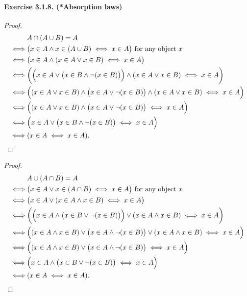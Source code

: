 \paragraph{Exercise 3.1.8. (*Absorption laws)}
\begin{proof}
    \begin{align*}
        & A \cap (A \cup B) = A
        \\\iff& \big( x \in A \land x \in (A \cup B) \iff x \in A \big) \text{ for any object $x$}
        \\\iff& \big( x \in A \land (x \in A \lor x \in B) \iff x \in A \big)
        \\\iff& \bigg( \Big(x \in A \lor \big(x\in B \land \lnot (x \in B) \big) \Big) \land (x \in A \lor x \in B) \iff x \in A \bigg)
        \\\iff& \Big( (x\in A \lor x \in B) \land \big( x\in A \lor \lnot(x \in B) \big) \land (x\in A \lor x \in B) \iff x \in A \Big)
        \\\iff& \Big( (x\in A \lor x \in B) \land \big( x\in A \lor \lnot(x \in B) \big) \iff x \in A \Big)
        \\\iff& \Big( x\in A \lor \big(x\in B \land \lnot(x\in B) \big) \iff x \in A \Big)
        \\\iff& ( x\in A \iff x \in A ). \qedhere
    \end{align*}
\end{proof}
\begin{proof}
    \begin{align*}
        & A \cup (A \cap B) = A
        \\\iff& \big( x \in A \lor x \in (A \cap B) \iff x \in A \big) \text{ for any object $x$}
        \\\iff& \big( x \in A \lor (x \in A \land x \in B) \iff x \in A \big)
        \\\iff& \bigg( \Big(x \in A \land \big(x\in B \lor \lnot (x \in B) \big) \Big) \lor (x \in A \land x \in B) \iff x \in A \bigg)
        \\\iff& \Big( (x\in A \land x \in B) \lor \big( x\in A \land \lnot(x \in B) \big) \lor (x\in A \land x \in B) \iff x \in A \Big)
        \\\iff& \Big( (x\in A \land x \in B) \lor \big( x\in A \land \lnot(x \in B) \big) \iff x \in A \Big)
        \\\iff& \Big( x\in A \land \big(x\in B \lor \lnot(x\in B) \big) \iff x \in A \Big)
        \\\iff& ( x\in A \iff x \in A ). \qedhere
    \end{align*}
\end{proof}